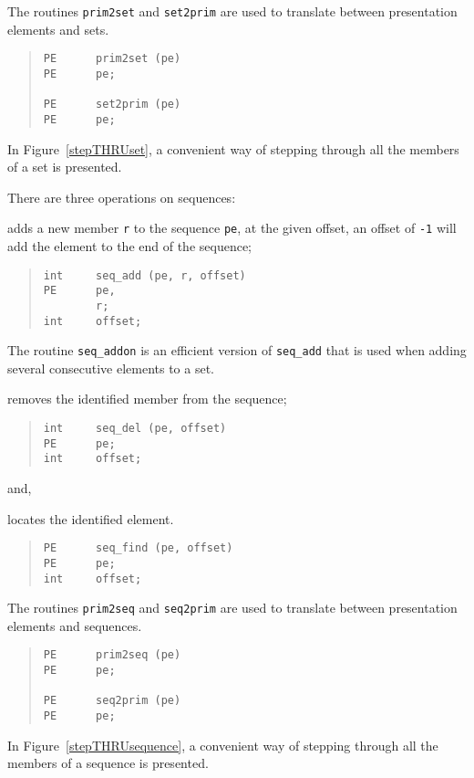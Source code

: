 The routines \verb"prim2set" and \verb"set2prim" are used to translate between
presentation elements and sets.
\begin{quote}\small\begin{verbatim}
PE      prim2set (pe)
PE      pe;

PE      set2prim (pe)
PE      pe;
\end{verbatim}\end{quote}
In Figure~\ref{stepTHRUset},
a convenient way of stepping through all the members of a set is presented.

There are three operations on sequences:
\begin{describe}
\item[\verb"seq\_add":] adds a new member \verb"r" to the sequence
\verb"pe", at the given offset, an offset of \verb"-1" will add the
element to the end of the sequence;
\begin{quote}\small\begin{verbatim}
int     seq_add (pe, r, offset)
PE      pe,
        r;
int     offset;
\end{verbatim}\end{quote}
The routine \verb"seq_addon" is an efficient version of \verb"seq_add" that
is used when adding several consecutive elements to a set.

\item[\verb"seq\_del":] removes the identified member from the
sequence;
\begin{quote}\small\begin{verbatim}
int     seq_del (pe, offset)
PE      pe;
int     offset;
\end{verbatim}\end{quote}
and,

\item[\verb"seq\_find":] locates the identified element.
\begin{quote}\small\begin{verbatim}
PE      seq_find (pe, offset)
PE      pe;
int     offset;
\end{verbatim}\end{quote}
\end{describe}
The routines \verb"prim2seq" and \verb"seq2prim" are used to translate between
presentation elements and sequences.
\begin{quote}\small\begin{verbatim}
PE      prim2seq (pe)
PE      pe;

PE      seq2prim (pe)
PE      pe;
\end{verbatim}\end{quote}
In Figure~\ref{stepTHRUsequence},
a convenient way of stepping through all the members of a sequence is
presented.

